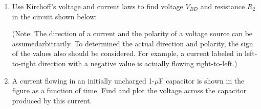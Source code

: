 \begin{enumerate}

\item Use Kirchoff's voltage and current laws to find voltage $V_{BD}$ and resistance 
$R_2$ in the circuit shown below:


(Note: The direction of a current and the polarity of a voltage source can
be assumedarbitrarily. To determined the actual direction and polarity, the
sign of the values also should be considered. For example, a current labeled 
in left-to-right direction with a negative value is actually flowing 
right-to-left.)


%







\item A current flowing in an initially uncharged 1-$\mu$F capacitor is shown
  in the figure as a function of time. Find and plot the voltage across the 
  capacitor produced by this current.




\end{enumerate}


